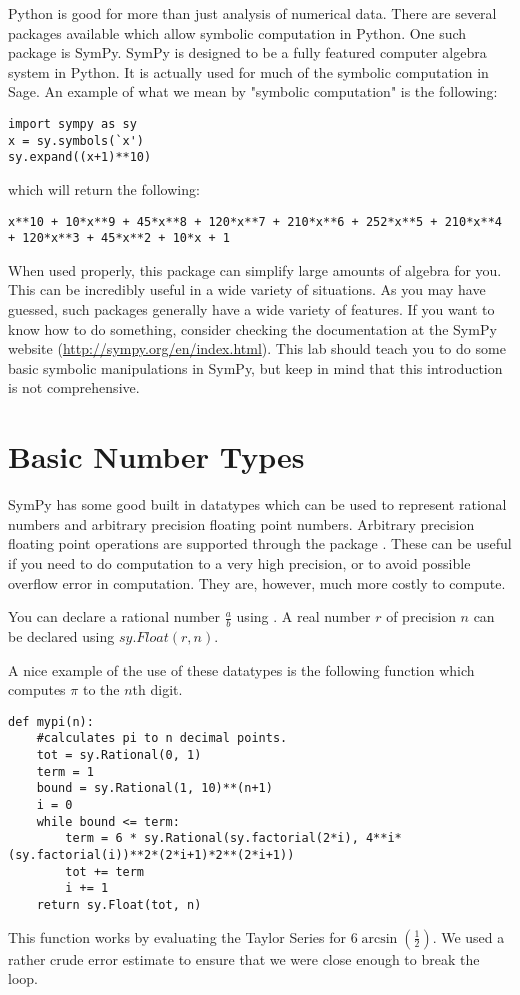 \label{lab:SymPy}


Python is good for more than just analysis of numerical data.
There are several packages available which allow symbolic computation in Python.
One such package is SymPy.
SymPy is designed to be a fully featured computer algebra system in Python.
It is actually used for much of the symbolic computation in Sage.
An example of what we mean by "symbolic computation" is the following:
\begin{lstlisting}
import sympy as sy
x = sy.symbols(`x')
sy.expand((x+1)**10)
\end{lstlisting}
which will return the following:
\begin{lstlisting}
x**10 + 10*x**9 + 45*x**8 + 120*x**7 + 210*x**6 + 252*x**5 + 210*x**4 + 120*x**3 + 45*x**2 + 10*x + 1
\end{lstlisting}
When used properly, this package can simplify large amounts of algebra for you.
This can be incredibly useful in a wide variety of situations.
As you may have guessed, such packages generally have a wide variety of features. 
If you want to know how to do something, consider checking the documentation  at the SymPy website (\url{http://sympy.org/en/index.html}).
This lab should teach you to do some basic symbolic manipulations in SymPy, but keep in mind that this introduction is not comprehensive.

\section*{Basic Number Types}
SymPy has some good built in datatypes which can be used to represent rational numbers and arbitrary precision floating point numbers.
Arbitrary precision floating point operations are supported through the package .
These can be useful if you need to do computation to a very high precision, or to avoid possible overflow error in computation.
They are, however, much more costly to compute.

You can declare a rational number $\frac{a}{b}$ using .
A real number $r$ of precision $n$ can be declared using $sy.Float(r,n)$.

A nice example of the use of these datatypes is the following function which computes $\pi$ to the $n$th digit.
\begin{lstlisting}
def mypi(n):
    #calculates pi to n decimal points.
    tot = sy.Rational(0, 1)
    term = 1
    bound = sy.Rational(1, 10)**(n+1)
    i = 0
    while bound <= term:
        term = 6 * sy.Rational(sy.factorial(2*i), 4**i*(sy.factorial(i))**2*(2*i+1)*2**(2*i+1))
        tot += term
        i += 1
    return sy.Float(tot, n)
\end{lstlisting}
This function works by evaluating the Taylor Series for $6\arcsin\left(\frac{1}{2}\right)$.
We used a rather crude error estimate to ensure that we were close enough to break the loop.

